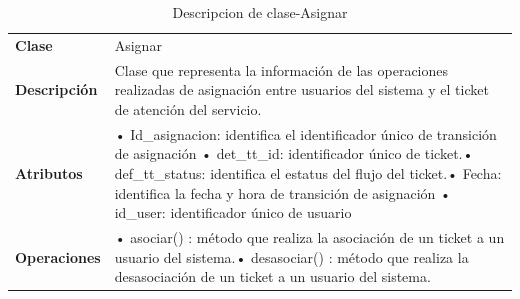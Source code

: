 \begin{table}[H]
	\centering
	\caption{Descripcion de clase-Asignar}
	\begin{tabular}{|p{6.145em}|p{28.07em}|}
		\toprule
		\rowcolor[rgb]{ .125,  .216,  .392} \multicolumn{2}{|p{34.215em}|}{\textcolor[rgb]{ 1,  1,  1}{\textbf{Clase Asignar}}} \\
		\midrule
		\textbf{Clase} & \multicolumn{1}{l|}{Asignar} \\
		\midrule
		\textbf{Descripción} & Clase que representa la información de las operaciones realizadas de asignación entre usuarios del sistema y el ticket  de atención del servicio. \\
		\midrule
		\textbf{Atributos } & •	Id\_asignacion: identifica el identificador único de transición de asignación \newline{}•	det\_tt\_id: identificador único de ticket.\newline{}•	def\_tt\_status: identifica el estatus del flujo del ticket.\newline{}•	Fecha: identifica la fecha y hora de transición de asignación \newline{}•	id\_user: identificador único de usuario \\
		\midrule
		\textbf{Operaciones} & •	asociar()   :  método que realiza la asociación de un ticket a un usuario del sistema.\newline{}•	desasociar()  : método que realiza la desasociación  de un ticket a un usuario del sistema. \\
		\bottomrule
	\end{tabular}%
	\label{tab:clas7}%
\end{table}%


